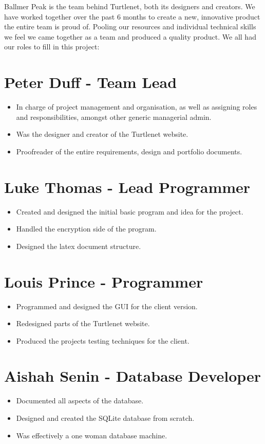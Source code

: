 Ballmer Peak is the team behind Turtlenet, both its designers and creators.
We have worked together over the past 6 months to create a new, innovative 
product the entire team is proud of. Pooling our resources and individual
technical skills we feel we came together as a team and produced a quality
product. We all had our roles to fill in this project:

\section{Peter Duff - Team Lead}
\begin{itemize}
\item In charge of project management and organisation, as well as assigning roles and 
responsibilities, amongst other generic managerial admin.
\item Was the designer and creator of the Turtlenet website.
\item Proofreader of the entire requirements, design and portfolio documents.
\end{itemize}

\section{Luke Thomas - Lead Programmer}
\begin{itemize}
\item Created and designed the initial basic program and idea for the project.
\item Handled the encryption side of the program.
\item Designed the latex document structure.
\end{itemize}

\section{Louis Prince - Programmer}
\begin{itemize}
\item Programmed and designed the GUI for the client version.
\item Redesigned parts of the Turtlenet website.
\item Produced the projects testing techniques for the client.
\end{itemize}

\section{Aishah Senin - Database Developer}
\begin{itemize}
\item Documented all aspects of the database.
\item Designed and created the SQLite database from scratch.
\item Was effectively a one woman database machine.
\end{itemize}

